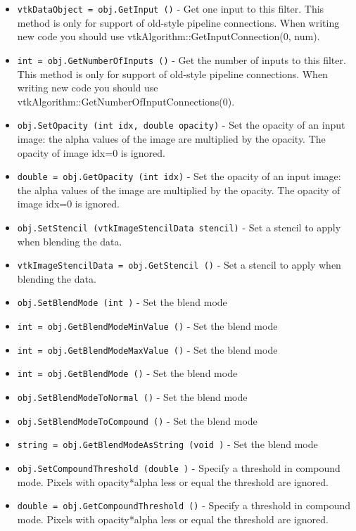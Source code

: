\begin{itemize}
\item  \verb|vtkDataObject = obj.GetInput ()| -  Get one input to this filter. This method is only for support of
 old-style pipeline connections.  When writing new code you should
 use vtkAlgorithm::GetInputConnection(0, num).

\item  \verb|int = obj.GetNumberOfInputs ()| -  Get the number of inputs to this filter. This method is only for
 support of old-style pipeline connections.  When writing new code
 you should use vtkAlgorithm::GetNumberOfInputConnections(0).

\item  \verb|obj.SetOpacity (int idx, double opacity)| -  Set the opacity of an input image: the alpha values of the image are
 multiplied by the opacity.  The opacity of image idx=0 is ignored.

\item  \verb|double = obj.GetOpacity (int idx)| -  Set the opacity of an input image: the alpha values of the image are
 multiplied by the opacity.  The opacity of image idx=0 is ignored.

\item  \verb|obj.SetStencil (vtkImageStencilData stencil)| -  Set a stencil to apply when blending the data.

\item  \verb|vtkImageStencilData = obj.GetStencil ()| -  Set a stencil to apply when blending the data.

\item  \verb|obj.SetBlendMode (int )| -  Set the blend mode

\item  \verb|int = obj.GetBlendModeMinValue ()| -  Set the blend mode

\item  \verb|int = obj.GetBlendModeMaxValue ()| -  Set the blend mode

\item  \verb|int = obj.GetBlendMode ()| -  Set the blend mode

\item  \verb|obj.SetBlendModeToNormal ()| -  Set the blend mode

\item  \verb|obj.SetBlendModeToCompound ()| -  Set the blend mode

\item  \verb|string = obj.GetBlendModeAsString (void )| -  Set the blend mode

\item  \verb|obj.SetCompoundThreshold (double )| -  Specify a threshold in compound mode. Pixels with opacity*alpha less
 or equal the threshold are ignored.

\item  \verb|double = obj.GetCompoundThreshold ()| -  Specify a threshold in compound mode. Pixels with opacity*alpha less
 or equal the threshold are ignored.

\end{itemize}
